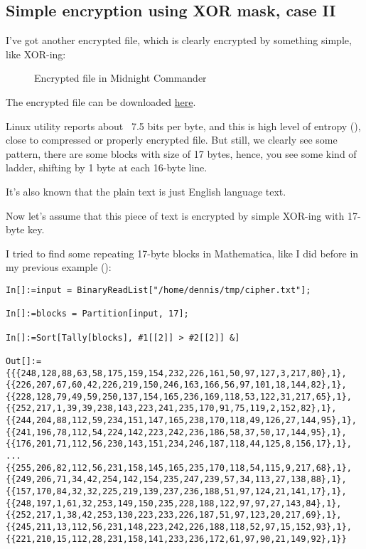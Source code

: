 \subsection{Simple encryption using XOR mask, case II}
\label{XOR_mask_2}

I've got another encrypted file, which is clearly encrypted by something simple, like XOR-ing:

\begin{figure}[H]
\centering
{}
\caption{Encrypted file in Midnight Commander}
\end{figure}

The encrypted file can be downloaded \href{https://github.com/dennis714/RE-for-beginners/blob/master/ff/XOR/mask_2/files/cipher.txt}{here}.

 Linux utility reports about ~7.5 bits per byte, and this is high level of entropy (),
close to compressed or properly encrypted file.
But still, we clearly see some pattern, there are some blocks with size of 17 bytes, hence, you see some kind of ladder, shifting by 1 byte at each 16-byte line.

It's also known that the plain text is just English language text.

Now let's assume that this piece of text is encrypted by simple XOR-ing with 17-byte key.

I tried to find some repeating 17-byte blocks in Mathematica, like I did before in my previous example ():

\begin{lstlisting}[caption=Mathematica,style=custommath]
In[]:=input = BinaryReadList["/home/dennis/tmp/cipher.txt"];

In[]:=blocks = Partition[input, 17];

In[]:=Sort[Tally[blocks], #1[[2]] > #2[[2]] &]

Out[]:={{{248,128,88,63,58,175,159,154,232,226,161,50,97,127,3,217,80},1},
{{226,207,67,60,42,226,219,150,246,163,166,56,97,101,18,144,82},1},
{{228,128,79,49,59,250,137,154,165,236,169,118,53,122,31,217,65},1},
{{252,217,1,39,39,238,143,223,241,235,170,91,75,119,2,152,82},1},
{{244,204,88,112,59,234,151,147,165,238,170,118,49,126,27,144,95},1},
{{241,196,78,112,54,224,142,223,242,236,186,58,37,50,17,144,95},1},
{{176,201,71,112,56,230,143,151,234,246,187,118,44,125,8,156,17},1},
...
{{255,206,82,112,56,231,158,145,165,235,170,118,54,115,9,217,68},1},
{{249,206,71,34,42,254,142,154,235,247,239,57,34,113,27,138,88},1},
{{157,170,84,32,32,225,219,139,237,236,188,51,97,124,21,141,17},1},
{{248,197,1,61,32,253,149,150,235,228,188,122,97,97,27,143,84},1},
{{252,217,1,38,42,253,130,223,233,226,187,51,97,123,20,217,69},1},
{{245,211,13,112,56,231,148,223,242,226,188,118,52,97,15,152,93},1},
{{221,210,15,112,28,231,158,141,233,236,172,61,97,90,21,149,92},1}}
\end{lstlisting}

